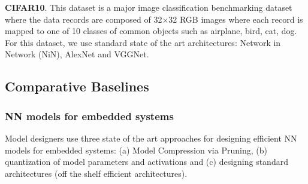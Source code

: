 \noindent\textbf{CIFAR10}.
This dataset is a major image classification benchmarking dataset where the data records are composed of 32$\times$32 RGB images where each record is mapped to one of 10 classes of common objects such as airplane, bird, cat, dog.
For this dataset, we use standard state of the art architectures: Network in Network (NiN), AlexNet and VGGNet.


\subsection{Comparative Baselines}
\label{baselines}

\subsubsection{NN models for embedded systems}

Model designers use three state of the art approaches for designing efficient NN models for embedded systems: (a) Model Compression via Pruning, (b) quantization of model parameters and activations and (c) designing standard architectures (off the shelf efficient architectures).

